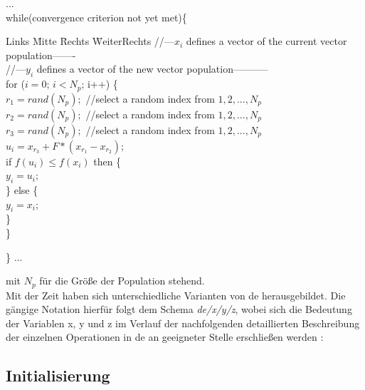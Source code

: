 		\begin{algorithm*}[H]
			\SetAlgoLined
			...\\
			while(convergence criterion not yet met)\{
				\begin{tabbing}
					Links \= Mitte \= Rechts \= WeiterRechts \kill
					\>//---$x_{i}$ defines a vector of the current vector population-------\\
					\>//---$y_{i}$ defines a vector of the new vector population-----------\\
				
					\>for ($i=0$; $i<N_{p}$; i++) \{\\
				
					\>\>$r_{1} = rand(N_{p});$ //select a random index from $1, 2, ..., N_{p}$\\
					\>\>$r_{2} = rand(N_{p});$ //select a random index from $1, 2, ..., N_{p}$\\
					\>\>$r_{3} = rand(N_{p});$ //select a random index from $1, 2, ..., N_{p}$\\
					\>\>\textbf{$u_{i} = x_{r_{3}} + F * (x_{r_{1}} - x_{r_{2}})$};\\
					\>\>if $f(u_{i}) \leq f(x_{i})$  then \{\\
						\>\>\>$y_{i} = u_{i};$\\
					\>\>\} else \{\\
						\>\>\>$y_{i} = x_{i};$\\
					\>\>\}\\
					\>\}
				\end{tabbing}
			\}
			...
			
		\end{algorithm*}
		\begin{center}
		\end{center}
		
	
		mit $N_{p}$ für die Größe der Population stehend.\\
		Mit der Zeit haben sich unterschiedliche Varianten von \gls{de} herausgebildet. Die gängige Notation hierfür folgt dem Schema \textit{\gls{de}/x/y/z}, wobei sich die Bedeutung der Variablen x, y und z im Verlauf der nachfolgenden detaillierten Beschreibung der einzelnen Operationen in \gls{de} an geeigneter Stelle erschließen werden \cite{storn-price-de, storn-price-de-book}: 
		
		\subsection{Initialisierung}
		\label{sub:de-init}
		
